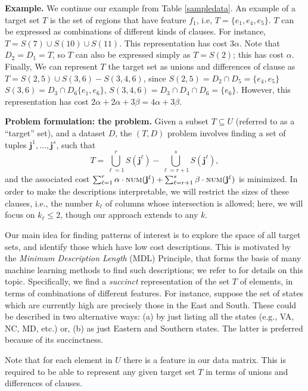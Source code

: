 \noindent
\textbf{Example.} 
We continue our example from Table \ref{sampledata}. An example of a target
set $T$ is the set of regions that have feature $f_1$, i.e, $T = \{e_1, e_4, e_5\}$.
$T$ can be expressed as combinations of different kinds of clauses.
For instance, $T=S(7)\cup S(10) \cup S(11)$. This representation has cost $3\alpha$.
Note that $D_2=D_1=T$, so $T$ can also be expressed simply as $T=S(2)$; this
has cost $\alpha$.
Finally, We can represent $T$ the target set as unions and differences of clause as
$T = S(2, 5) \cup S(3, 6) - S(3,4,6)$, since
$S(2, 5) = D_2\cap D_5=\{e_4, e_5\}$
$S(3, 6) = D_3 \cap D_6 \{e_1, e_6\}$,
$S(3, 4, 6) = D_3 \cap D_4 \cap D_6 = \{e_6\}$.
However, this representation has cost $2\alpha + 2\alpha + 3\beta=4\alpha+3\beta$.

\noindent
\textbf{Problem formulation: the \mindesc{} problem.} 
Given a subset $T\subseteq U$ (referred to as a ``target'' set),
and a dataset $D$, the \mindesc{}$(T, D)$ problem involves
finding a set of tuples $\mathbf{j}^{1},\ldots,\mathbf{j}^{s}$,
such that
\[
T = \bigcup_{\ell=1}^r S(\mathbf{j}^{\ell}) - \bigcup_{\ell=r+1}^s S(\mathbf{j}^{\ell}),
\]
and the associated cost
$\sum_{\ell=1}^r \alpha\cdot \textsc{num}(\mathbf{j}^{\ell}) + \sum_{\ell=r+1}^s \beta\cdot \textsc{num}(\mathbf{j}^{\ell})$ is minimized. 
In order to make the descriptions interpretable, we will restrict the sizes of
these clauses, i.e., the number $k_{\ell}$ of columns whose intersection is allowed;
here, we will focus on $k_{\ell}\leq 2$, though our approach extends to any $k$.

Our main idea for finding patterns of interest is to explore the space of
all target sets, and identify those which have low cost descriptions.
This is motivated by the \emph{Minimum Description Length} (MDL) Principle, that forms the basis of many
machine learning methods to find such descriptions; we refer to \cite{grunwald:07:book}
for details on this topic.
Specifically, we find a \emph{succinct} representation of the set $T$ of elements,
in terms of combinations of different features.
For instance, suppose the set of states which are currently high are precisely
those in the East and South.
These could be described in two alternative ways:
(a) by just listing all the states (e.g., VA, NC, MD, etc.) or,
(b) as just Eastern and Southern states. The latter is preferred because of its succinctness.

Note that for each element in $U$ there is a feature in our data matrix. This is required to be able to represent
any given target set $T$ in terms of unions and differences of clauses.

